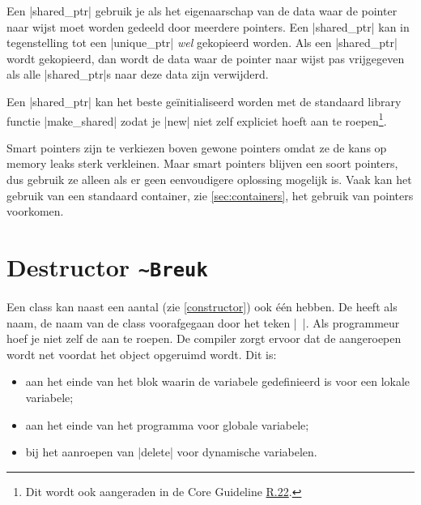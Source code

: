 \begin{cpplstShortInline}
Een |shared_ptr| gebruik je als het eigenaarschap van de data waar de pointer naar wijst moet worden gedeeld door meerdere pointers.
Een |shared_ptr| kan in tegenstelling tot een |unique_ptr| \emph{wel} gekopieerd worden. 
Als een |shared_ptr| wordt gekopieerd, dan wordt de data waar de pointer naar wijst pas vrijgegeven als alle |shared_ptr|s naar deze data zijn verwijderd.

Een |shared_ptr| kan het beste geïnitialiseerd worden met de standaard library functie |make_shared| zodat je |new| niet zelf expliciet hoeft aan te roepen\footnote{%
	Dit wordt ook aangeraden in de \Cpp{} Core Guideline \href{https://isocpp.github.io/CppCoreGuidelines/CppCoreGuidelines\#r22-use-make_shared-to-make-shared_ptrs}{R.22}.
}.

Smart pointers zijn te verkiezen boven gewone pointers omdat ze de kans op memory leaks sterk verkleinen.
Maar smart pointers blijven een soort pointers, dus gebruik ze alleen als er geen eenvoudigere oplossing mogelijk is.
Vaak kan het gebruik van een standaard container, zie \cref{sec:containers}, het gebruik van pointers voorkomen.

\section[Destructor \texttt{\textasciitilde{}Breuk}]{Destructor \texorpdfstring{\texttt{\textasciitilde{}Breuk}}{\textasciitilde{}Breuk}}
Een class kan naast een aantal  (zie \cref{constructor}) ook één \emph{} hebben.
De \label{destructor} heeft als naam, de naam van de class voorafgegaan door het teken |~|.
Als programmeur hoef je niet zelf de  aan te roepen.
De compiler zorgt ervoor dat de  aangeroepen wordt net voordat het object opgeruimd wordt.
Dit is:
\begin{itemize}
    \item \label{nutteloos haakje?}aan het einde van het blok waarin de variabele gedefinieerd is voor een lokale variabele;
    \item aan het einde van het programma voor globale variabele;
    \item bij het aanroepen van |delete| voor dynamische variabelen.
\end{itemize}


\end{cpplstShortInline}
